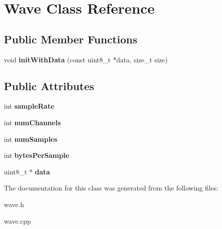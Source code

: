 \hypertarget{class_wave}{
\section{Wave Class Reference}
\label{class_wave}
}
\subsection*{Public Member Functions}
\begin{DoxyCompactItemize}
\item 
\hypertarget{class_wave_a33db4a869b15584198d36c80f6bee284}{
void {\bfseries initWithData} (const uint8\_\-t $\ast$data, size\_\-t size)}
\label{class_wave_a33db4a869b15584198d36c80f6bee284}

\end{DoxyCompactItemize}
\subsection*{Public Attributes}
\begin{DoxyCompactItemize}
\item 
\hypertarget{class_wave_ad4b9f9e4844087071f221b44d69baf41}{
int {\bfseries sampleRate}}
\label{class_wave_ad4b9f9e4844087071f221b44d69baf41}

\item 
\hypertarget{class_wave_a19c7abafddb96a810fb370a7a0e8914b}{
int {\bfseries numChannels}}
\label{class_wave_a19c7abafddb96a810fb370a7a0e8914b}

\item 
\hypertarget{class_wave_a03caf3727c678e29026bd3628468aaa7}{
int {\bfseries numSamples}}
\label{class_wave_a03caf3727c678e29026bd3628468aaa7}

\item 
\hypertarget{class_wave_a3e60209058fd253011ce449245c813a1}{
int {\bfseries bytesPerSample}}
\label{class_wave_a3e60209058fd253011ce449245c813a1}

\item 
\hypertarget{class_wave_a626e52590fd144f7054109b1ce256db0}{
uint8\_\-t $\ast$ {\bfseries data}}
\label{class_wave_a626e52590fd144f7054109b1ce256db0}

\end{DoxyCompactItemize}


The documentation for this class was generated from the following files:\begin{DoxyCompactItemize}
\item 
wave.h\item 
wave.cpp\end{DoxyCompactItemize}
